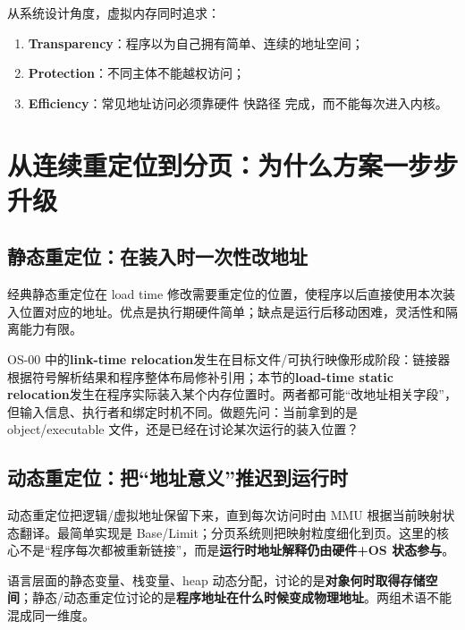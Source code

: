 \documentclass[11pt,a4paper]{ctexart}
\newcommand{\kw}[1]{\textbf{#1}}
\begin{document}
\begin{bridge}[虚拟内存的三个最重要目标]
从系统设计角度，虚拟内存同时追求：
\begin{enumerate}
  \item \kw{Transparency}：程序以为自己拥有简单、连续的地址空间；
  \item \kw{Protection}：不同主体不能越权访问；
  \item \kw{Efficiency}：常见地址访问必须靠硬件 快路径 完成，而不能每次进入内核。
\end{enumerate}
\end{bridge}

\section{从连续重定位到分页：为什么方案一步步升级}

\subsection{静态重定位：在装入时一次性改地址}
经典静态重定位在 load time 修改需要重定位的位置，使程序以后直接使用本次装入位置对应的地址。优点是执行期硬件简单；缺点是运行后移动困难，灵活性和隔离能力有限。

\begin{warn}
OS-00 中的\kw{link-time relocation}发生在目标文件/可执行映像形成阶段：链接器根据符号解析结果和程序整体布局修补引用；本节的\kw{load-time static relocation}发生在程序实际装入某个内存位置时。两者都可能“改地址相关字段”，但输入信息、执行者和绑定时机不同。做题先问：当前拿到的是 object/executable 文件，还是已经在讨论某次运行的装入位置？
\end{warn}

\subsection{动态重定位：把“地址意义”推迟到运行时}
动态重定位把逻辑/虚拟地址保留下来，直到每次访问时由 MMU 根据当前映射状态翻译。最简单实现是 Base/Limit；分页系统则把映射粒度细化到页。这里的核心不是“程序每次都被重新链接”，而是\kw{运行时地址解释仍由硬件+OS 状态参与}。

\begin{exam}
语言层面的静态变量、栈变量、heap 动态分配，讨论的是\kw{对象何时取得存储空间}；静态/动态重定位讨论的是\kw{程序地址在什么时候变成物理地址}。两组术语不能混成同一维度。
\end{exam}
\end{document}
